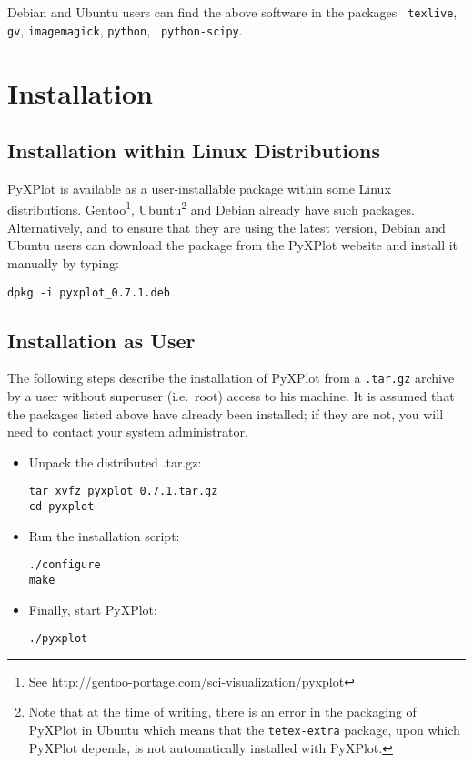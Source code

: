 Debian and Ubuntu users can find the above software in the packages {\tt
texlive}, {\tt gv}, {\tt imagemagick}, {\tt python}, {\tt
python-scipy}.

\section{Installation}

\subsection{Installation within Linux Distributions}

PyXPlot is available as a user-installable package within some Linux
distributions. Gentoo\footnote{See
\url{http://gentoo-portage.com/sci-visualization/pyxplot}}, Ubuntu\footnote{Note that at the time of
writing, there is an error in the packaging of PyXPlot in Ubuntu which means
that the {\tt tetex-extra} package, upon which PyXPlot depends, is not
automatically installed with PyXPlot.} and Debian already have such packages.
Alternatively, and to ensure that they are using the latest version, Debian and
Ubuntu users can download the package from the PyXPlot website and install it
manually by typing:

\begin{verbatim}
dpkg -i pyxplot_0.7.1.deb
\end{verbatim}

\subsection{Installation as User}

The following steps describe the installation of PyXPlot from a {\tt .tar.gz}
archive by a user without superuser (i.e.\ root) access to his machine. It is
assumed that the packages listed above have already been installed; if they are
not, you will need to contact your system
administrator.

\begin{itemize}
\item Unpack the distributed .tar.gz:

\begin{verbatim}
tar xvfz pyxplot_0.7.1.tar.gz
cd pyxplot
\end{verbatim}

\item Run the installation script:

\begin{verbatim}
./configure
make
\end{verbatim}

\item Finally, start PyXPlot:

\begin{verbatim}
./pyxplot
\end{verbatim}

\end{itemize}

